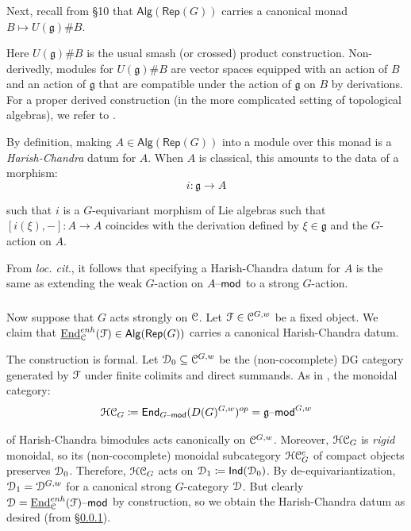 \documentclass[reqno,11pt]{amsart}
\numberwithin{equation}{subsection}
\theoremstyle{remark}
\newcommand{\sC}{{\EuScript C}}
\newcommand{\sD}{{\EuScript D}}
\newcommand{\sF}{{\EuScript F}}
\newcommand{\sH}{{\EuScript H}}
\newcommand{\fg}{{\mathfrak g}}
\newcommand{\on}{\operatorname}
\newcommand{\ul}{\underline}
\newcommand{\mathendash}{\text{\textendash}}
\newcommand{\End}{\on{End}}
\newcommand{\Rep}{\mathsf{Rep}}
\renewcommand{\mod}{\mathendash\mathsf{mod}}
\newcommand{\Ind}{\mathsf{Ind}}
\newcommand{\TwoEnd}{\mathsf{End}}
\newcommand{\Alg}{\mathsf{Alg}}
\renewcommand{\subset}{\subseteq}
\begin{document}
\subsubsection{}\label{sss:hc-recap}

Next, recall from \cite{methods} \S 10
that $\Alg(\Rep(G))$ carries a canonical monad $B \mapsto U(\fg) \# B$.

Here $U(\fg) \# B$ is the usual smash (or crossed) product construction.
Non-derivedly, modules for $U(\fg) \# B$ are vector spaces equipped
with an action of $B$ and an action of $\fg$ that are compatible under the
action of $\fg$ on $B$ by derivations. For a proper derived construction 
(in the more complicated setting of topological algebras), we refer to
\cite{methods}.

By definition, making $A \in \Alg(\Rep(G))$ into a module over this monad
is a \emph{Harish-Chandra} datum for $A$. When $A$ is classical, this 
amounts to the data of a morphism:
%
\[
i:\fg \to A 
\]

\noindent such that $i$ is a $G$-equivariant morphism of Lie algebras such that 
$[i(\xi),-]:A \to A$
coincides with the derivation defined by  $\xi \in \fg$ and the $G$-action on $A$.

From \emph{loc. cit}., it follows that specifying a Harish-Chandra datum for
$A$ is the same as extending the weak $G$-action on $A\mod$ to a strong $G$-action.

\subsubsection{}\label{sss:hc-functor}

Now suppose that $G$ acts strongly on $\sC$. Let $\sF \in \sC^{G,w}$
be a fixed object. We claim that $\ul{\End}_{\sC}^{enh}(\sF) \in \Alg(\Rep(G))$ 
carries a canonical Harish-Chandra datum.

The construction is formal. Let $\sD_0 \subset \sC^{G,w}$ be the
(non-cocomplete) DG category generated by $\sF$ under finite colimits and 
direct summands. As in \cite{dario-*/!}, the monoidal category:
%
\[
\sH\sC_G \coloneqq \TwoEnd_{G\mod}(D(G)^{G,w})^{op} = \fg\mod^{G,w}
\]

\noindent of Harish-Chandra bimodules acts canonically on $\sC^{G,w}$. 
Moreover, $\sH\sC_G$ is \emph{rigid} monoidal, so its (non-cocomplete) 
monoidal subcategory 
$\sH\sC_G^c$ of compact objects preserves $\sD_0$. Therefore, 
$\sH\sC_G$ acts on $\sD_1 \coloneqq \Ind(\sD_0)$. By de-equivariantization,
$\sD_1 = \sD^{G,w}$ for a canonical strong $G$-category $\sD$.
But clearly $\sD = \ul{\End}_{\sC}^{enh}(\sF)\mod$ by construction,
so we obtain the Harish-Chandra datum as desired (from \S \ref{sss:hc-recap}).
\end{document}
